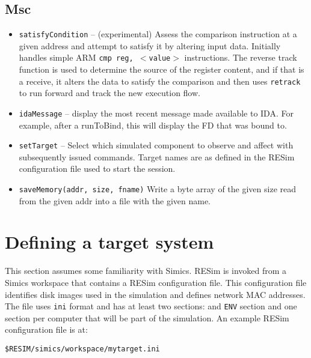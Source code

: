 \documentclass[titlepage]{article}
\begin{document}
\subsection{Msc}
\begin{itemize}

\item{\tt satisfyCondition} -- (experimental) Assess the comparison instruction at a given address and attempt to satisfy it by altering input data.  
Initially handles simple ARM {\tt cmp reg, $<$value$>$} instructions.  The 
reverse track function is used to determine the source of the register content, and if that is a receive, it alters the data to satisfy the
comparison and then uses {\tt retrack} to run forward and track the new execution flow.

\item{\tt idaMessage} -- display the most recent message made available to IDA.  For example, after a runToBind, this will display the FD that was bound to.
\item {\tt setTarget} -- Select which simulated component to observe and affect with subsequently issued commands.  Target names are as defined in the
RESim configuration file used to start the session.

\item {\tt saveMemory(addr, size, fname)} Write a byte array of the given size read from the given addr into a file with the given name.

\end{itemize}

\section{Defining a target system}
\label{configuration}
This section assumes some familiarity with Simics.  RESim is invoked from a Simics workspace that contains a RESim configuration file.
This configuration file identifies disk images used in the simulation and defines network MAC addresses.  
The file uses {\tt ini} format and has at least two sections: and {\tt ENV} section and one section per computer that will be part
of the simulation.  An example RESim configuration file is at:
\begin{verbatim}
$RESIM/simics/workspace/mytarget.ini
\end{verbatim}
\end{document}
